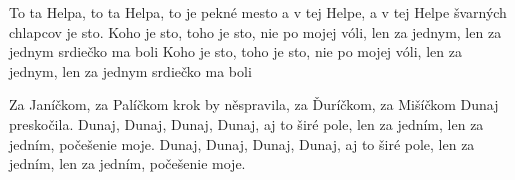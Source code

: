
\beginverse{}
To ta Helpa, to ta Helpa, to je pekné mesto
a v tej Helpe, a v tej Helpe švarných chlapcov je sto.
Koho je sto, toho je sto, nie po mojej vóli,
len za jednym, len za jednym srdiečko ma boli
Koho je sto, toho je sto, nie po mojej vóli,
len za jednym, len za jednym srdiečko ma boli
\endverse{}

\beginverse{}
Za Janíčkom, za Palíčkom krok by něspravila,
za Ďuríčkom, za Mišíčkom Dunaj preskočila.
Dunaj, Dunaj, Dunaj, Dunaj, aj to širé pole,
len za jedním, len za jedním, počešenie moje.
Dunaj, Dunaj, Dunaj, Dunaj, aj to širé pole,
len za jedním, len za jedním, počešenie moje.
\endverse{}

\endsong{}

